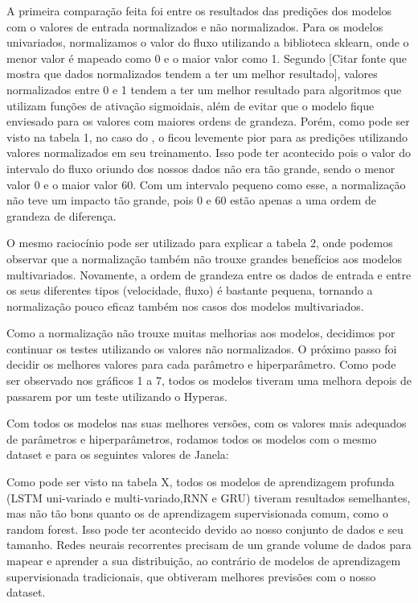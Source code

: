 A primeira comparação feita foi entre os resultados das predições dos modelos com o valores de entrada normalizados e não normalizados. Para os modelos univariados, normalizamos o valor do fluxo utilizando a biblioteca sklearn, onde o menor valor é mapeado como 0 e o maior valor como 1. Segundo [Citar fonte que mostra que dados normalizados tendem a ter um melhor resultado], valores normalizados entre 0 e 1 tendem a ter um melhor resultado para algoritmos que utilizam funções de ativação sigmoidais, além de evitar que o modelo fique enviesado para os valores com maiores ordens de grandeza. Porém, como pode ser visto na tabela 1, no caso do , o  ficou levemente pior para as predições utilizando valores normalizados em seu treinamento. Isso pode ter acontecido pois o valor do intervalo do fluxo oriundo dos nossos dados não era tão grande, sendo o menor valor 0 e o maior valor 60. Com um intervalo pequeno como esse, a normalização não teve um impacto tão grande, pois 0 e 60 estão apenas a uma ordem de grandeza de diferença.

O mesmo raciocínio pode ser utilizado para explicar a tabela 2, onde podemos observar que a normalização também não trouxe grandes benefícios aos modelos multivariados. Novamente, a ordem de grandeza entre os dados de entrada e entre os seus diferentes tipos (velocidade, fluxo) é bastante pequena, tornando a normalização pouco eficaz também nos casos dos modelos multivariados.

Como a normalização não trouxe muitas melhorias aos modelos, decidimos por continuar os testes utilizando os valores não normalizados. O próximo passo foi decidir os melhores valores para cada parâmetro e hiperparâmetro. Como pode ser observado nos gráficos 1  a 7, todos os modelos tiveram uma melhora depois de passarem por um teste utilizando o Hyperas.

Com todos os modelos nas suas melhores versões, com os valores mais adequados de parâmetros e hiperparâmetros, rodamos todos os modelos com o mesmo dataset e para os seguintes valores de Janela: 


Como pode ser visto na tabela X,  todos  os  modelos  de aprendizagem  profunda  (LSTM  uni-variado  e  multi-variado,RNN  e  GRU)  tiveram  resultados  semelhantes,  mas  não  tão bons quanto os de aprendizagem supervisionada comum, como o random forest. Isso  pode  ter  acontecido  devido  ao  nosso  conjunto  de dados  e  seu  tamanho.  Redes  neurais  recorrentes  precisam de  um  grande  volume  de  dados  para  mapear  e  aprender  a sua  distribuição,  ao  contrário  de  modelos  de  aprendizagem supervisionada  tradicionais, que obtiveram melhores previsões com o nosso dataset.

